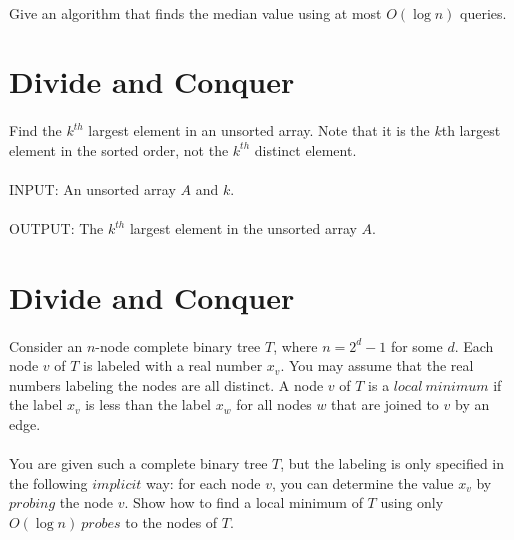 \documentclass[a4paper,11pt]{article}
\begin{document}
\paragraph{}Give an algorithm that finds the median value using at most $O(\log n)$ queries.

\section{Divide and Conquer}

\paragraph{}Find the $k^{th}$ largest element in an unsorted array. Note that it is the $k$th largest element in the sorted order, not the $k^{th}$ distinct element.

\paragraph{}INPUT: An unsorted array $A$ and $k$.

\paragraph{}OUTPUT: The $k^{th}$ largest element in the unsorted array $A$.


\section{Divide and Conquer}

\paragraph{}Consider an $n$-node complete binary tree $T$, where $n=2^d-1$ for some $d$. Each node $v$ of $T$ is labeled with a real number $x_v$. You may assume that the real numbers labeling the nodes are all distinct. A node $v$ of $T$ is a $local\ minimum$ if the label $x_v$ is less than the label $x_w$ for all nodes $w$ that are joined to $v$ by an edge.

\paragraph{}You are given such a complete binary tree $T$, but the labeling is only specified in the following $implicit$ way: for each node $v$, you can determine the value $x_v$ by $probing$ the node $v$. Show how to find a local minimum of $T$ using only $O(\log n)\ probes$ to the nodes of $T$.
\end{document}
